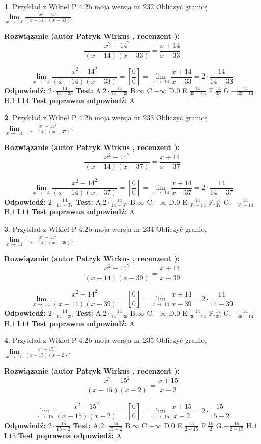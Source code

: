 \documentclass[12pt, a4paper]{article}
\theoremstyle{definition} %
\newtheorem{zad}{}
\newcommand{\zadStart}[1]{\begin{zad}#1\newline}
\newcommand{\zadStop}{\end{zad}}
\newcommand{\rozwStart}[2]{\noindent \textbf{Rozwiązanie (autor #1 , recenzent #2): }\newline}
\newcommand{\rozwStop}{\newline}
\newcommand{\odpStart}{\noindent \textbf{Odpowiedź:}\newline}
\newcommand{\odpStop}{\newline}
\newcommand{\testStart}{\noindent \textbf{Test:}\newline}
\newcommand{\testStop}{\newline}
\newcommand{\kluczStart}{\noindent \textbf{Test poprawna odpowiedź:}\newline}
\newcommand{\kluczStop}{\newline}
\begin{document}
\zadStart{Przykład z Wikieł P 4.2b moja wersja nr 232}
Obliczyć granicę $\lim\limits_{x\to\ 14}\frac{x^{2}-14^{2}}{(x-14)(x-33)}$.
\zadStop
\rozwStart{Patryk Wirkus}{}
$$\frac{x^{2}-14^{2}}{(x-14)(x-33)}=\frac{x+14}{x-33}$$

$$\lim\limits_{x\to\ 14}\frac{x^{2}-14^{2}}{(x-14)(x-33)}=[\frac{0}{0}]=\lim\limits_{x\to\ 14}\frac{x+14}{x-33}=2 \cdot \frac{14}{14-33}$$
\rozwStop
\odpStart
$2 \cdot \frac{14}{14-33}$
\odpStop
\testStart
A.$2 \cdot \frac{14}{14-33}$
B.$\infty$
C.$-\infty$
D.$0$
E.$\frac{14}{33-14}$
F.$\frac{14}{33}$
G.$-\frac{14}{33-14}$
H.$1$
I.$14$
\testStop
\kluczStart
A
\kluczStop



\zadStart{Przykład z Wikieł P 4.2b moja wersja nr 233}
Obliczyć granicę $\lim\limits_{x\to\ 14}\frac{x^{2}-14^{2}}{(x-14)(x-37)}$.
\zadStop
\rozwStart{Patryk Wirkus}{}
$$\frac{x^{2}-14^{2}}{(x-14)(x-37)}=\frac{x+14}{x-37}$$

$$\lim\limits_{x\to\ 14}\frac{x^{2}-14^{2}}{(x-14)(x-37)}=[\frac{0}{0}]=\lim\limits_{x\to\ 14}\frac{x+14}{x-37}=2 \cdot \frac{14}{14-37}$$
\rozwStop
\odpStart
$2 \cdot \frac{14}{14-37}$
\odpStop
\testStart
A.$2 \cdot \frac{14}{14-37}$
B.$\infty$
C.$-\infty$
D.$0$
E.$\frac{14}{37-14}$
F.$\frac{14}{37}$
G.$-\frac{14}{37-14}$
H.$1$
I.$14$
\testStop
\kluczStart
A
\kluczStop



\zadStart{Przykład z Wikieł P 4.2b moja wersja nr 234}
Obliczyć granicę $\lim\limits_{x\to\ 14}\frac{x^{2}-14^{2}}{(x-14)(x-39)}$.
\zadStop
\rozwStart{Patryk Wirkus}{}
$$\frac{x^{2}-14^{2}}{(x-14)(x-39)}=\frac{x+14}{x-39}$$

$$\lim\limits_{x\to\ 14}\frac{x^{2}-14^{2}}{(x-14)(x-39)}=[\frac{0}{0}]=\lim\limits_{x\to\ 14}\frac{x+14}{x-39}=2 \cdot \frac{14}{14-39}$$
\rozwStop
\odpStart
$2 \cdot \frac{14}{14-39}$
\odpStop
\testStart
A.$2 \cdot \frac{14}{14-39}$
B.$\infty$
C.$-\infty$
D.$0$
E.$\frac{14}{39-14}$
F.$\frac{14}{39}$
G.$-\frac{14}{39-14}$
H.$1$
I.$14$
\testStop
\kluczStart
A
\kluczStop



\zadStart{Przykład z Wikieł P 4.2b moja wersja nr 235}
Obliczyć granicę $\lim\limits_{x\to\ 15}\frac{x^{2}-15^{2}}{(x-15)(x-2)}$.
\zadStop
\rozwStart{Patryk Wirkus}{}
$$\frac{x^{2}-15^{2}}{(x-15)(x-2)}=\frac{x+15}{x-2}$$

$$\lim\limits_{x\to\ 15}\frac{x^{2}-15^{2}}{(x-15)(x-2)}=[\frac{0}{0}]=\lim\limits_{x\to\ 15}\frac{x+15}{x-2}=2 \cdot \frac{15}{15-2}$$
\rozwStop
\odpStart
$2 \cdot \frac{15}{15-2}$
\odpStop
\testStart
A.$2 \cdot \frac{15}{15-2}$
B.$\infty$
C.$-\infty$
D.$0$
E.$\frac{15}{2-15}$
F.$\frac{15}{2}$
G.$-\frac{15}{2-15}$
H.$1$
I.$15$
\testStop
\kluczStart
A
\kluczStop
\end{document}
